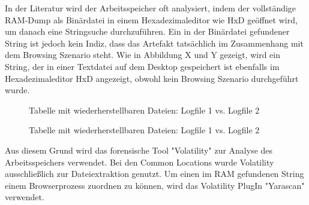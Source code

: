 In der Literatur wird der Arbeitsspeicher oft analysiert, indem der vollständige RAM-Dump als Binärdatei in einem Hexadezimaleditor wie HxD geöffnet wird, um danach eine Stringsuche durchzuführen. \cite{Rochmadi.2017, Md.2018, Montasari.2015}
Ein in der Binärdatei gefundener String ist jedoch kein Indiz, dass das Artefakt tatsächlich im Zusammenhang mit dem Browsing Szenario steht.
Wie in Abbildung X und Y gezeigt, wird ein String, der in einer Textdatei auf dem Desktop gespeichert ist ebenfalls im Hexadezimaleditor HxD angezeigt, obwohl kein Browsing Szenario durchgeführt wurde.
\begin{figure}[h!]
	\caption{Tabelle mit wiederherstellbaren Dateien: Logfile 1 vs. Logfile 2}
\end{figure}
\begin{figure}[h!]
	\caption{Tabelle mit wiederherstellbaren Dateien: Logfile 1 vs. Logfile 2}
\end{figure}

Aus diesem Grund wird das forensische Tool "Volatility" zur Analyse des Arbeitsspeichers verwendet. 
Bei den Common Locations wurde Volatility ausschließlich zur Dateiextraktion genutzt.
Um einen im RAM gefundenen String einem Browserprozess zuordnen zu können, wird das Volatility PlugIn "Yarascan" verwendet.

